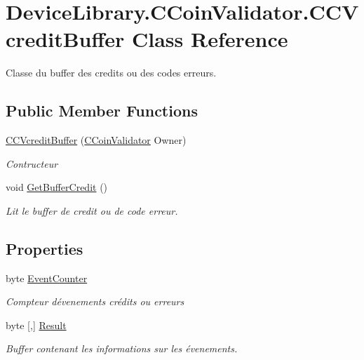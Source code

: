 \hypertarget{class_device_library_1_1_c_coin_validator_1_1_c_c_vcredit_buffer}{}\section{Device\+Library.\+C\+Coin\+Validator.\+C\+C\+Vcredit\+Buffer Class Reference}
\label{class_device_library_1_1_c_coin_validator_1_1_c_c_vcredit_buffer}


Classe du buffer des credits ou des codes erreurs.  


\subsection*{Public Member Functions}
\begin{DoxyCompactItemize}
\item 
\mbox{\hyperlink{class_device_library_1_1_c_coin_validator_1_1_c_c_vcredit_buffer_afe2f20c8e3af5841dbde8b6b7ec769c7}{C\+C\+Vcredit\+Buffer}} (\mbox{\hyperlink{class_device_library_1_1_c_coin_validator}{C\+Coin\+Validator}} Owner)
\begin{DoxyCompactList}\small\item\em Contructeur \end{DoxyCompactList}\item 
void \mbox{\hyperlink{class_device_library_1_1_c_coin_validator_1_1_c_c_vcredit_buffer_aefd4b396be72cd71df3589250525b1a4}{Get\+Buffer\+Credit}} ()
\begin{DoxyCompactList}\small\item\em Lit le buffer de credit ou de code erreur. \end{DoxyCompactList}\end{DoxyCompactItemize}
\subsection*{Properties}
\begin{DoxyCompactItemize}
\item 
byte \mbox{\hyperlink{class_device_library_1_1_c_coin_validator_1_1_c_c_vcredit_buffer_a54e1fef4fc72a0f5eed0cc4843db9573}{Event\+Counter}}
\begin{DoxyCompactList}\small\item\em Compteur d\textquotesingle{}évenements crédits ou erreurs \end{DoxyCompactList}\item 
byte \mbox{[},\mbox{]} \mbox{\hyperlink{class_device_library_1_1_c_coin_validator_1_1_c_c_vcredit_buffer_a78845c21ba07dfdf73e85b1992ee94c0}{Result}}
\begin{DoxyCompactList}\small\item\em Buffer contenant les informations sur les évenements. \end{DoxyCompactList}\end{DoxyCompactItemize}


